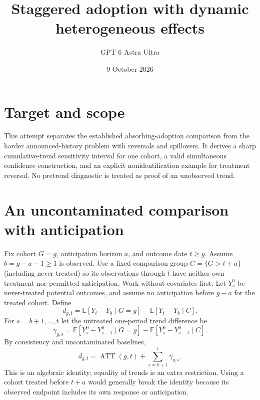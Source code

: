 \documentclass[11pt]{article}
\title{Staggered adoption with dynamic heterogeneous effects}
\author{GPT 6 Astra Ultra}
\date{9 October 2026}
\theoremstyle{definition}
\newcommand{\E}{\mathbb E}
\begin{document}
\maketitle
\section*{Target and scope}
This attempt separates the established absorbing-adoption comparison from the
harder announced-history problem with reversals and spillovers. It derives a
sharp cumulative-trend sensitivity interval for one cohort, a valid simultaneous
confidence construction, and an explicit nonidentification example for treatment
reversal. No pretrend diagnostic is treated as proof of an unobserved trend.

\section*{An uncontaminated comparison with anticipation}
Fix cohort $G=g$, anticipation horizon $a$, and outcome date $t\ge g$.
Assume $b=g-a-1\ge1$ is observed. Use a fixed comparison group
$C=\{G>t+a\}$ (including never treated) so its observations through $t$ have
neither own treatment nor permitted anticipation. Work without covariates first.
Let $Y_s^0$ be never-treated potential outcomes, and assume no anticipation
before $g-a$ for the treated cohort. Define
\[
 d_{g,t}=\E[Y_t-Y_b\mid G=g]-\E[Y_t-Y_b\mid C].
\]
For $s=b+1,\ldots,t$ let the untreated one-period trend difference be
\[
 \gamma_{g,s}=\E[Y_s^0-Y_{s-1}^0\mid G=g]
              -\E[Y_s^0-Y_{s-1}^0\mid C].
\]
By consistency and uncontaminated baselines,
\[
 d_{g,t}=\operatorname{ATT}(g,t)+\sum_{s=b+1}^t\gamma_{g,s}. \tag{1}
\]
This is an algebraic identity; equality of trends is an extra restriction.
Using a cohort treated before $t+a$ would generally break the identity because
its observed endpoint includes its own response or anticipation.
\end{document}
